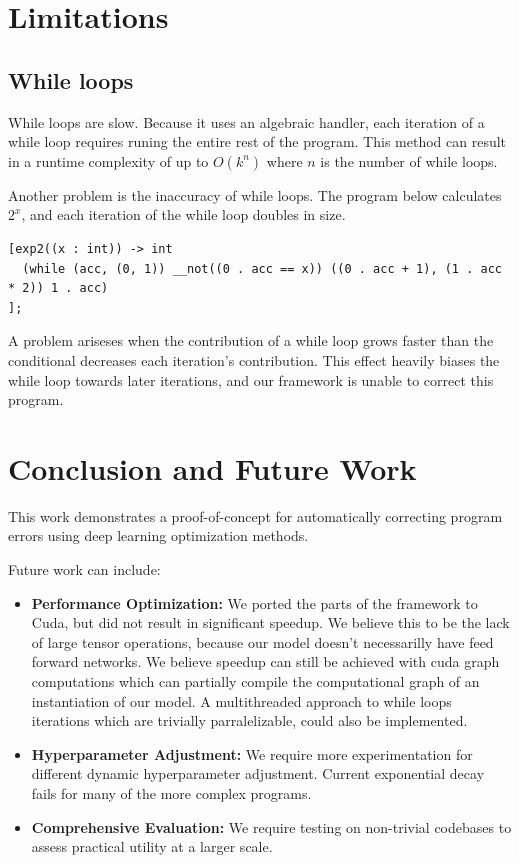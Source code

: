 \documentclass{article}
\begin{document}
\section{Limitations}
\subsection{While loops}
While loops are slow. Because it uses an algebraic handler, each iteration of a while loop requires runing the entire rest of the program. This method can result in a runtime complexity of up to $O(k^n)$ where $n$ is the number of while loops.

Another problem is the inaccuracy of while loops. The program below calculates $2^x$, and each iteration of the while loop doubles in size.
\begin{verbatim}
[exp2((x : int)) -> int
  (while (acc, (0, 1)) __not((0 . acc == x)) ((0 . acc + 1), (1 . acc * 2)) 1 . acc)
];
\end{verbatim}
A problem ariseses when the contribution of a while loop grows faster than the conditional decreases each iteration's contribution. This effect heavily biases the while loop towards later iterations, and our framework is unable to correct this program.

\section{Conclusion and Future Work}
This work demonstrates a proof-of-concept for automatically correcting program errors using deep learning optimization methods.

Future work can include:
\begin{itemize}
\item \textbf{Performance Optimization:} We ported the parts of the framework to Cuda, but did not result in significant speedup. We believe this to be the lack of large tensor operations, because our model doesn't necessarilly have feed forward networks. We believe speedup can still be achieved with cuda graph computations which can partially compile the computational graph of an instantiation of our model. A multithreaded approach to while loops iterations which are trivially parralelizable, could also be implemented.
\item \textbf{Hyperparameter Adjustment:} We require more experimentation for different dynamic hyperparameter adjustment. Current exponential decay fails for many of the more complex programs.
\item \textbf{Comprehensive Evaluation:} We require testing on non-trivial codebases to assess practical utility at a larger scale.
\end{itemize}



\end{document}
